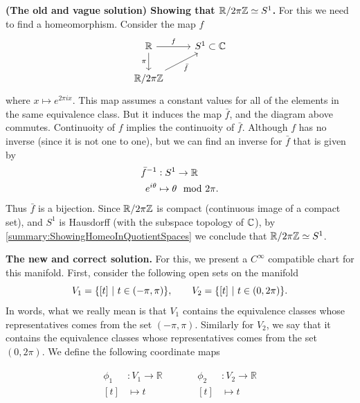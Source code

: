 \begin{solution}
	\noindent \textbf{(The old and vague solution) Showing that $ \mathbb{R}/2\pi\mathbb{Z} \simeq S^1 $.} For this we need to find a homeomorphism. Consider the map $ f $
	\[\begin{tikzcd}
		\R & {S^1}\subset \C \\
		{\R/2\pi\Z}
		\arrow["f", from=1-1, to=1-2]
		\arrow["\pi"', from=1-1, to=2-1]
		\arrow["{\bar{f}}"', from=2-1, to=1-2]
	\end{tikzcd}\]
	where $x \mapsto e^{2\pi i x}$. This map assumes a constant values for all of the elements in the same equivalence class. But it induces the map $ \bar{f} $, and the diagram above commutes. Continuoity of $ f $ implies the continuoity of $ \bar{f} $. Although $ f $ has no inverse (since it is not one to one), but we can find an inverse for $ \bar{f} $ that is given by
	\begin{align*}
		\bar{f}^{-1}&: S^1 \to \mathbb{R} \\
		e^{i\theta} &\mapsto \theta \mod 2\pi .
	\end{align*}
	Thus $ \bar{f} $ is a bijection. Since $ \mathbb{R}/2\pi\mathbb{Z} $ is compact (continuous image of a compact set), and $ S^1 $ is Hausdorff (with the subspace topology of $ \mathbb{C} $), by \autoref{summary:ShowingHomeoInQuotientSpaces} we conclude that $ \mathbb{R}/2\pi\mathbb{Z} \simeq S^1 $.
	\vspace{5pt}
	
	\noindent \textbf{The new and correct solution.} For this, we present a $ C^\infty $ compatible chart for this manifold. First, consider the following open sets on the manifold
	\[ V_1 = \set{[t]\ |\ t\in (-\pi,\pi) }, \qquad V_2 = \set{[t]\ |\ t\in(0,2\pi)}. \]
	In words, what we really mean is that $ V_1 $ contains the equivalence classes whose representatives comes from the set $ (-\pi,\pi) $. Similarly for $ V_2 $, we say that it contains the equivalence classes whose representatives comes from the set $ (0,2\pi) $. We define the following coordinate maps

	\[
	\begin{array}{cc}
		\begin{aligned}
			\phi_1 &: V_1 \to \mathbb{R} \\
			[t] &\mapsto t 
		\end{aligned}
		&\qquad
		\begin{aligned}
			\phi_2 &: V_2 \to \mathbb{R} \\
			[t] & \mapsto t 
		\end{aligned}
	\end{array}
	\]
	

\end{solution}
